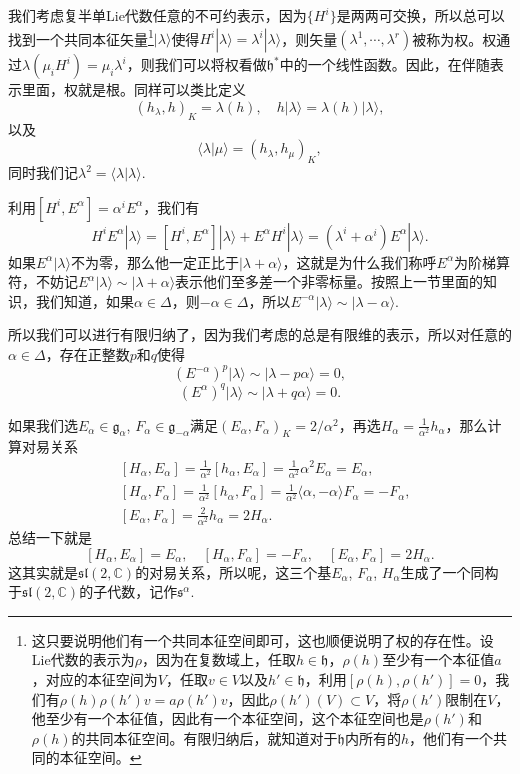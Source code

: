 \documentclass[9pt]{extarticle}
\newcommand{\cc}{\mathbb{C}}
\newcommand{\lag}{{\mathfrak{g}}}
\begin{document}
\para 我们考虑复半单Lie代数任意的不可约表示，因为$\{H^i\}$是两两可交换，所以总可以找到一个共同本征矢量\footnote{这只要说明他们有一个共同本征空间即可，这也顺便说明了权的存在性。设Lie代数的表示为$\rho$，因为在复数域上，任取$h\in\mathfrak{h}$，$\rho(h)$至少有一个本征值$a$，对应的本征空间为$V$，任取$v\in V$以及$h'\in \mathfrak{h}$，利用$[\rho(h),\rho(h')]=0$，我们有$\rho(h)\rho(h')v=a\rho(h')v$，因此$\rho(h')(V)\subset V$，将$\rho(h')$限制在$V$，他至少有一个本征值，因此有一个本征空间，这个本征空间也是$\rho(h')$和$\rho(h)$的共同本征空间。有限归纳后，就知道对于$\mathfrak{h}$内所有的$h$，他们有一个共同的本征空间。}$|\lambda\rangle$使得$H^i|\lambda\rangle=\lambda^i|\lambda\rangle$，则矢量$(\lambda^1,\cdots,\lambda^r)$被称为权。权通过$\lambda(\mu_iH^i)=\mu_i\lambda^i$，则我们可以将权看做$\mathfrak{h}^*$中的一个线性函数。因此，在伴随表示里面，权就是根。同样可以类比定义
\[
	(h_\lambda,h)_K=\lambda(h),\quad h|\lambda\rangle=\lambda(h)|\lambda\rangle,
\]
以及
\[
	\langle \lambda|\mu\rangle=(h_\lambda,h_\mu)_K,
\]
同时我们记$\lambda^2=\langle \lambda|\lambda\rangle$.

利用$[H^i,E^\alpha]=\alpha^iE^\alpha$，我们有
\[
	H^iE^\alpha|\lambda\rangle=[H^i,E^\alpha]|\lambda\rangle+E^\alpha H^i|\lambda\rangle=(\lambda^i+\alpha^i)E^\alpha |\lambda\rangle.
\]
如果$E^\alpha |\lambda\rangle$不为零，那么他一定正比于$|\lambda+\alpha\rangle$，这就是为什么我们称呼$E^\alpha$为阶梯算符，不妨记$E^\alpha |\lambda\rangle\sim |\lambda+\alpha\rangle$表示他们至多差一个非零标量。按照上一节里面的知识，我们知道，如果$\alpha\in \Delta$，则$-\alpha\in\Delta$，所以$E^{-\alpha} |\lambda\rangle\sim |\lambda-\alpha\rangle$.

所以我们可以进行有限归纳了，因为我们考虑的总是有限维的表示，所以对任意的$\alpha\in \Delta$，存在正整数$p$和$q$使得
\[
	(E^{-\alpha})^p |\lambda\rangle\sim |\lambda-p\alpha\rangle =0,
\]
\[
	(E^{\alpha})^q |\lambda\rangle\sim |\lambda+q\alpha\rangle =0.
\]

\para 如果我们选$E_\alpha\in\lag_\alpha$, $F_\alpha\in\lag_{-\alpha}$满足$(E_\alpha,F_{\alpha})_K=2/\alpha^2$，再选$H_\alpha=\frac{1}{\alpha^2}h_\alpha$，那么计算对易关系
\[
	\begin{split}
	&[H_\alpha,E_\alpha]=\frac{1}{\alpha^2}[h_\alpha,E_\alpha]=\frac{1}{\alpha^2}\alpha^2 E_\alpha=E_\alpha,\\
	&[H_\alpha,F_\alpha]=\frac{1}{\alpha^2}[h_\alpha,F_\alpha]=\frac{1}{\alpha^2}\langle \alpha,-\alpha \rangle F_\alpha=-F_\alpha,\\
	&[E_\alpha,F_\alpha]=\frac{2}{\alpha^2}h_\alpha=2H_\alpha.
	\end{split}
\]
总结一下就是
\[
	[H_\alpha,E_\alpha]=E_\alpha,\quad[H_\alpha,F_\alpha]=-F_\alpha,\quad[E_\alpha,F_\alpha]=2H_\alpha.
\]
这其实就是$\mathfrak{sl}(2,\cc)$的对易关系，所以呢，这三个基$E_\alpha$, $F_\alpha$, $H_\alpha$生成了一个同构于$\mathfrak{sl}(2,\cc)$的子代数，记作$\mathfrak{s}^\alpha$.
\end{document}
